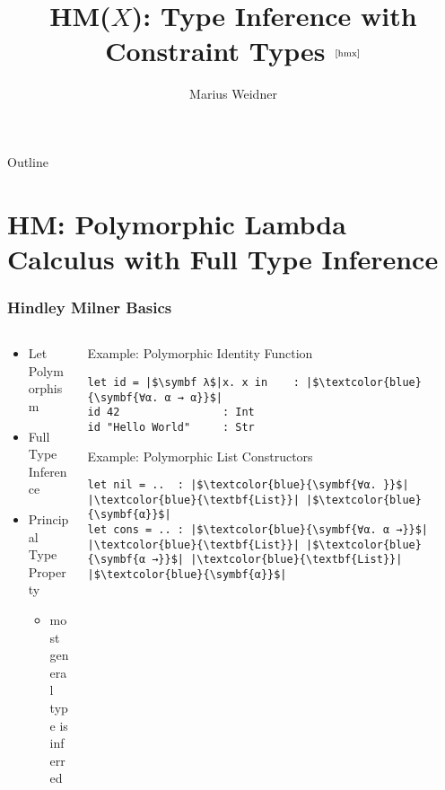 \documentclass[aspectratio=169]{beamer}
\title{HM($X$): Type Inference with Constraint Types $^{\text{\cite{hmx}}}$}
\institute[Uni Freiburg]{Chair of Programming Languages, University of
  Freiburg}
\author{Marius Weidner}
\begin{document}
\begin{frame}
  \titlepage
\end{frame}

\begin{frame}{Outline}
  \tableofcontents
\end{frame}

\section{HM: Polymorphic Lambda Calculus with Full Type Inference}

\begin{frame}[fragile]
  \frametitle{Hindley Milner Basics}
  \begin{columns}
    \begin{column}{0.38\textwidth}
      \begin{center}
        \begin{itemize}
          \item Let Polymorphism
          \item Full Type Inference
          \item Principal Type Property
                \begin{itemize}
                  \item most general type is inferred
                \end{itemize}
        \end{itemize}
      \end{center}
    \end{column}
    \begin{column}{0.6\textwidth}
      \begin{center}
        \begin{block}{Example: Polymorphic Identity Function}
          \begin{verbatim}
let id = |$\symbf λ$|x. x in    : |$\textcolor{blue}{\symbf{∀α. α → α}}$| 
id 42                : Int
id "Hello World"     : Str
          \end{verbatim}
        \end{block}
      \end{center}
      \begin{center}
        \begin{block}{Example: Polymorphic List Constructors}
          \begin{verbatim}
let nil = ..  : |$\textcolor{blue}{\symbf{∀α. }}$| |\textcolor{blue}{\textbf{List}}| |$\textcolor{blue}{\symbf{α}}$| 
let cons = .. : |$\textcolor{blue}{\symbf{∀α. α →}}$| |\textcolor{blue}{\textbf{List}}| |$\textcolor{blue}{\symbf{α →}}$| |\textcolor{blue}{\textbf{List}}| |$\textcolor{blue}{\symbf{α}}$| 
          \end{verbatim}
        \end{block}
      \end{center}
    \end{column}
  \end{columns}
\end{frame}
\end{document}
